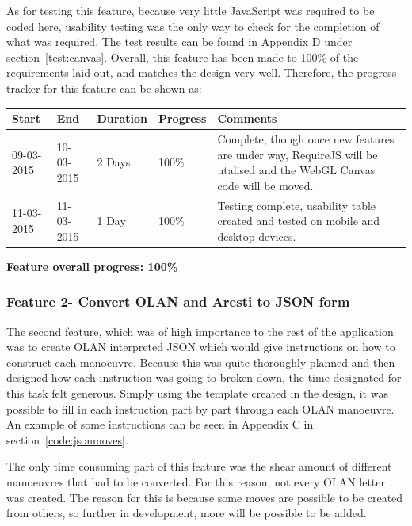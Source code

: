 As for testing this feature, because very little JavaScript was required to be coded here, usability testing was the only way to check for the completion of what was required. The test results can be found in Appendix D under section~\ref{test:canvas}. Overall, this feature has been made to 100\% of the requirements laid out, and matches the design very well. Therefore, the progress tracker for this feature can be shown as:

\begin{table}[h]
\begin{tabular}{|l|l|l|l|p{7cm}|}
\hline
\textbf{Start} & \textbf{End} & \textbf{Duration} & \textbf{Progress} & \textbf{Comments}                                                                                                     \\ \hline
09-03-2015     & 10-03-2015   & 2 Days            & 100\%             & Complete, though once new features are under way, RequireJS will be utalised and the WebGL Canvas code will be moved. \\ \hline
11-03-2015     & 11-03-2015   & 1 Day            & 100\%             & Testing complete, usability table created and tested on mobile and desktop devices.\\ \hline
\end{tabular}
\end{table}

\textbf{Feature overall progress: 100\%}

\subsubsection{Feature 2- Convert OLAN and Aresti to JSON form}
The second feature, which was of high importance to the rest of the application was to create OLAN interpreted JSON which would give instructions on how to construct each manoeuvre. Because this was quite thoroughly planned and then designed how each instruction was going to broken down, the time designated for this task felt generous. Simply using the template created in the design, it was possible to fill in each instruction part by part through each OLAN manoeuvre. An example of some instructions can be seen in Appendix C in section~\ref{code:jsonmoves}.

The only time consuming part of this feature was the shear amount of different manoeuvres that had to be converted. For this reason, not every OLAN letter was created. The reason for this is because some moves are possible to be created from others, so further in development, more will be possible to be added. 

